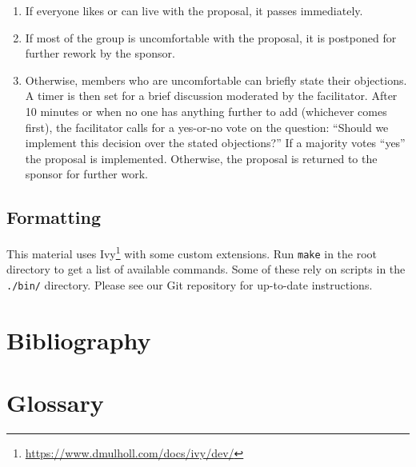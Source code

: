 \documentclass[krantzl]{krantz}
\newcommand{\hreffoot}[2]{{#1}\footnote{\href{#2}{#2}}}
\begin{document}
\begin{enumerate}
\begin{itemize}
\end{itemize}



\item 

If everyone likes or can live with the proposal, it passes immediately.



\item 

If most of the group is uncomfortable with the proposal, it is postponed for
    further rework by the sponsor.



\item 

Otherwise, members who are uncomfortable can briefly state their objections.
    A timer is then set for a brief discussion moderated by the facilitator.
    After 10 minutes or when no one has anything further to add (whichever comes
    first), the facilitator calls for a yes-or-no vote on the question: “Should
    we implement this decision over the stated objections?”  If a majority votes
    “yes” the proposal is implemented.  Otherwise, the proposal is returned to
    the sponsor for further work.



\end{enumerate}

\section*{Formatting}


This material uses \hreffoot{Ivy}{https://www.dmulholl.com/docs/ivy/dev/} with some custom extensions.
Run \texttt{make} in the root directory to get a list of available commands.
Some of these rely on scripts in the \texttt{./bin/} directory.
Please see our Git repository for up-to-date instructions.

\chapter{Bibliography}\label{bibliography}
\printbibliography[heading=none]

\chapter{Glossary}\label{glossary}
\end{document}
